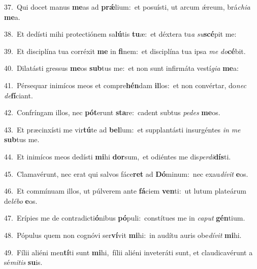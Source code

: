 {\numbfont\textcolor{\numbcolor}{37.}}~Qui docet manus \textbf{me}\-as ad \textbf{prǽ}\-lium:~\star et posuísti, ut arcum ǽreum, brá\-\textit{chi}\-\textit{a} \textbf{me}\-a.\par
{\numbfont\textcolor{\numbcolor}{38.}}~Et dedísti mihi protectiónem sa\-\textbf{lú}\-tis \textbf{tu}\-æ:~\star et déxtera tu\textit{a} \textit{su}\-\textbf{scé}pit me:\par
{\numbfont\textcolor{\numbcolor}{39.}}~Et disciplína tua corréxit \textbf{me} in \textbf{fi}\-nem:~\star et disciplína tua ipsa \textit{me} \textit{do}\-\textbf{cé}bit.\par
{\numbfont\textcolor{\numbcolor}{40.}}~Dilatásti gressus \textbf{me}\-os \textbf{sub}\-tus me:~\star et non sunt infirmáta vestí\-\textit{gi}\-\textit{a} \textbf{me}\-a:\par
{\numbfont\textcolor{\numbcolor}{41.}}~Pérsequar inimícos meos et compre\-\textbf{hén}\-dam \textbf{il}\-los:~\star et non convértar, do\textit{nec} \textit{de}\-\textbf{fí}ciant.\par
{\numbfont\textcolor{\numbcolor}{42.}}~Confríngam illos, nec \textbf{pót}\-erunt \textbf{sta}\-re:~\star cadent subtus \textit{pe}\-\textit{des} \textbf{me}\-os.\par
{\numbfont\textcolor{\numbcolor}{43.}}~Et præcinxísti me vir\-\textbf{tú}\-te ad \textbf{bel}\-lum:~\star et supplantásti insurgéntes \textit{in} \textit{me} \textbf{sub}\-tus me.\par
{\numbfont\textcolor{\numbcolor}{44.}}~Et inimícos meos dedísti \textbf{mi}\-hi \textbf{dor}\-sum,~\star et odiéntes me dis\-\textit{per}\-\textit{di}\textbf{dís}ti.\par
{\numbfont\textcolor{\numbcolor}{45.}}~Clamavérunt, nec erat qui salvos fáce\textbf{ret} ad \textbf{Dó}\-minum:~\star nec exau\-\textit{dí}\-\textit{vit} \textbf{e}\-os.\par
{\numbfont\textcolor{\numbcolor}{46.}}~Et commínuam illos, ut púlverem ante \textbf{fá}\-ciem \textbf{ven}\-ti:~\star ut lutum plateárum de\-\textit{lé}\-\textit{bo} \textbf{e}\-os.\par
{\numbfont\textcolor{\numbcolor}{47.}}~Erípies me de contradicti\-\textbf{ó}\-nibus \textbf{pó}\-puli:~\star constítues me in \textit{ca}\-\textit{put} \textbf{gén}\-tium.\par
{\numbfont\textcolor{\numbcolor}{48.}}~Pópulus quem non cognóvi ser\-\textbf{ví}\-vit \textbf{mi}\-hi:~\star in audítu auris obe\-\textit{dí}\-\textit{vit} \textbf{mi}\-hi.\par
{\numbfont\textcolor{\numbcolor}{49.}}~Fílii aliéni men\-\textbf{tí}\-ti sunt \textbf{mi}\-hi,~\star fílii aliéni inveteráti sunt, et claudicavérunt a sé\-\textit{mi}\-\textit{tis} \textbf{su}\-is.\par
